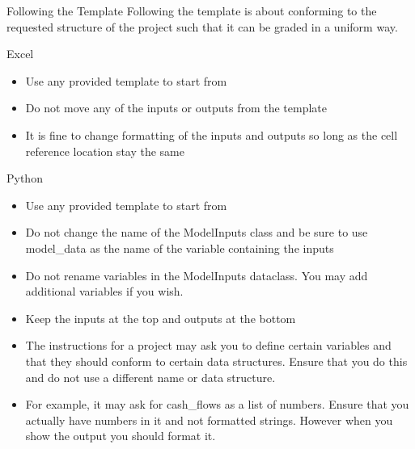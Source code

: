 \documentclass[]{article}
\begin{document}
\begin{section}{Following the Template}
Following the template is about conforming to the requested structure of the project such that it can be graded in a uniform way.
\begin{subsection}{Excel}
\begin{itemize}
\item Use any provided template to start from
\item Do not move any of the inputs or outputs from the template
\item It is fine to change formatting of the inputs and outputs so long as the cell reference location stay the same
\end{itemize}
\end{subsection}
\begin{subsection}{Python}
\begin{itemize}
\item Use any provided template to start from
\item Do not change the name of the ModelInputs class and be sure to use model\_data as the name of the variable containing the inputs
\item Do not rename variables in the ModelInputs dataclass. You may add additional variables if you wish.
\item Keep the inputs at the top and outputs at the bottom
\item The instructions for a project may ask you to define certain variables and that they should conform to certain data structures. Ensure that you do this and do not use a different name or data structure.
\item For example, it may ask for cash\_flows as a list of numbers. Ensure that you actually have numbers in it and not formatted strings. However when you show the output you should format it.
\end{itemize}
\end{subsection}
\end{section}
\end{document}
